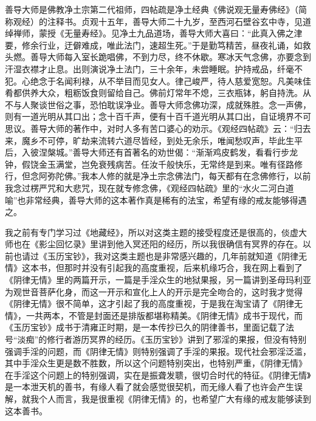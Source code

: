 \begin{book}
    善导大师是佛教净土宗第二代祖师，四帖疏是净土经典《佛说观无量寿佛经》（简称观经）的注释书。贞观十五年，善导大师二十九岁，至西河石壁谷玄中寺，见道绰禅师，蒙授《无量寿经》。见净土九品道场，善导大师大喜曰：“此真入佛之津要，修余行业，迂僻难成，唯此法门，速超生死。”于是勤笃精苦，昼夜礼诵，如救头燃。善导大师每入室长跪唱佛，不到力尽，终不休歇。寒冰天气念佛，亦要念到汗湿衣襟才止息。出则演说净土法门，三十余年，未尝睡眠。护持戒品，纤毫不犯。心绝念于名闻利禄，从不举目而见女人。律己峻严，待人慈爱宽恕。凡美味佳肴都供养大众，粗粝饭食则留给自己。佛前灯常年不熄，三衣瓶钵，躬自持洗。从不与人聚谈世俗之事，恐怕耽误净业。善导大师念佛功深，成就殊胜。念一声佛，则有一道光明从其口出；念十百千声，便有十百千道光明从其口出，自证境界不可思议。善导大师的著作中，对时人多有苦口婆心的劝示。《观经四帖疏》云：“归去来，魔乡不可停，旷劫来流转六道尽皆经，到处无余乐，唯闻愁叹声，毕此生平后，入彼涅槃城。”善导大师还有首著名的劝世偈：“渐渐鸡皮鹤发，看看行步龙钟，假饶金玉满堂，岂免衰残病苦。任汝千般快乐，无常终是到来。唯有径路修行，但念阿弥陀佛。”我本人修的就是净土宗念佛法门，每天都有在念佛修行，以前我念过楞严咒和大悲咒，现在就专修念佛，《观经四帖疏》里的“水火二河白道喻”也非常经典，善导大师的这本著作真是稀有的法宝，希望有缘的戒友能够得遇之。
\end{book}

\begin{book}
    我之前有专门学习过《地藏经》，所以对这类主题的接受程度还是很高的，倓虚大师也在《影尘回忆录》里讲到他入冥还阳的经历，所以我很确信有冥界的存在。以前也请过《玉历宝钞》，我对这类主题也是非常感兴趣的，几年前就知道《阴律无情》这本书，但那时并没有引起我的高度重视，后来机缘巧合，我在网上看到了《阴律无情》里的两篇开示，一篇是手淫众生的地狱果报，另一篇讲到圣母玛利亚为观世音菩萨化身，而这一开示和宣化上人的开示是完全吻合的，这时我才觉得《阴律无情》很不简单，这才引起了我的高度重视，于是我在淘宝请了《阴律无情》，一共两本，不管是封面还是排版都堪称精美。《阴律无情》成书于现代，而《玉历宝钞》成书于清雍正时期，是一本传抄已久的阴律善书，里面记载了法号“淡痴”的修行者游历冥界的经历。《玉历宝钞》讲到了邪淫的果报，但没有特别强调手淫的问题，而《阴律无情》则特别强调了手淫的果报。现代社会邪淫泛滥，其中手淫众生更是数不胜数，所以这个问题特别突出，也特别严重，《阴律无情》在手淫这个问题上的特别强调，实在是振聋发聩，很切合时代的特征。《阴律无情》是一本泄天机的善书，有缘人看了就会感觉很契机，而无缘人看了也许会产生误解，就我个人而言，我是很重视《阴律无情》的，也希望广大有缘的戒友能够读到这本善书。
\end{book}
